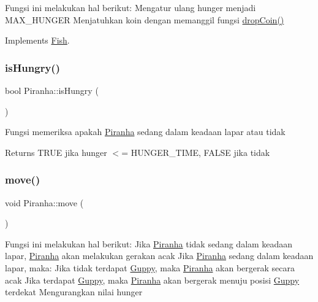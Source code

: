 Fungsi ini melakukan hal berikut\+: Mengatur ulang hunger menjadi M\+A\+X\+\_\+\+H\+U\+N\+G\+ER Menjatuhkan koin dengan memanggil fungsi \mbox{\hyperlink{class_piranha_aee107987f36631002f04c5283564382b}{drop\+Coin()}} 

Implements \mbox{\hyperlink{class_fish_af209980bd39b8de9b4bb38b7ad4edd04}{Fish}}.

\mbox{\label{class_piranha_a63ea79c792b44de29b5c6b6abc0f7a71}} 
\subsubsection{\texorpdfstring{is\+Hungry()}{isHungry()}}
{\footnotesize\ttfamily bool Piranha\+::is\+Hungry (\begin{DoxyParamCaption}{ }\end{DoxyParamCaption})}

Fungsi memeriksa apakah \mbox{\hyperlink{class_piranha}{Piranha}} sedang dalam keadaan lapar atau tidak \begin{DoxyReturn}{Returns}
T\+R\+UE jika hunger $<$= H\+U\+N\+G\+E\+R\+\_\+\+T\+I\+ME, F\+A\+L\+SE jika tidak 
\end{DoxyReturn}
\mbox{\label{class_piranha_a6b86e73b3e5a57ee0fdb768c24ab9b67}} 
\subsubsection{\texorpdfstring{move()}{move()}}
{\footnotesize\ttfamily void Piranha\+::move (\begin{DoxyParamCaption}{ }\end{DoxyParamCaption})\hspace{0.3cm}{\ttfamily [virtual]}}

Fungsi ini melakukan hal berikut\+: Jika \mbox{\hyperlink{class_piranha}{Piranha}} tidak sedang dalam keadaan lapar, \mbox{\hyperlink{class_piranha}{Piranha}} akan melakukan gerakan acak Jika \mbox{\hyperlink{class_piranha}{Piranha}} sedang dalam keadaan lapar, maka\+: Jika tidak terdapat \mbox{\hyperlink{class_guppy}{Guppy}}, maka \mbox{\hyperlink{class_piranha}{Piranha}} akan bergerak secara acak Jika terdapat \mbox{\hyperlink{class_guppy}{Guppy}}, maka \mbox{\hyperlink{class_piranha}{Piranha}} akan bergerak menuju posisi \mbox{\hyperlink{class_guppy}{Guppy}} terdekat Mengurangkan nilai hunger

